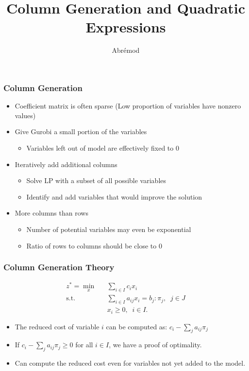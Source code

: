 \documentclass[12pt,handout]{beamer}
\title{Column Generation and Quadratic Expressions}
\author{Abr\'emod}
\begin{document}
\begin{frame}
\titlepage
\end{frame}

\begin{frame}
\frametitle{Column Generation}
\begin{itemize}
  \item Coefficient matrix is often sparse (Low proportion of variables have nonzero values)
  \item Give Gurobi a small portion of the variables
    \begin{itemize}
      \item Variables left out of model are effectively fixed to 0
    \end{itemize}
  \item Iteratively add additional columns
    \begin{itemize}
    \item Solve LP with a subset of all possible variables
    \item Identify and add variables that would improve the solution
    \end{itemize}      
    \item More columns than rows
    \begin{itemize}
      \item Number of potential variables may even be exponential
      \item Ratio of rows to columns should be close to 0
    \end{itemize}
\end{itemize}
\end{frame}

\begin{frame}
\frametitle{Column Generation Theory}
\begin{eqnarray}
z^* = \min_x && \sum_{i \in I} c_i x_i  \nonumber \\
\mbox{s.t.} && \sum_{i \in I} a_{ij} x_i  = b_j : \pi_j,\;\;j \in J \nonumber \\
&& x_i \ge 0,\;\;i \in I. \nonumber
\end{eqnarray}

\begin{itemize}
\item The reduced cost of variable $i$ can be computed as: $c_i - \sum_{j} a_{ij} \pi_j$
\item If $c_i - \sum_{j} a_{ij} \pi_j \ge 0$ for all $i \in I$, we have a proof of optimality.
\item Can compute the reduced cost even for variables not yet added to the model.
\end{itemize}
\end{frame}
\end{document}
